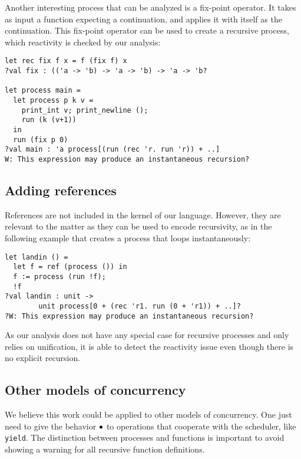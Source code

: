 \documentclass[9pt]{sigplanconf}
\begin{document}
Another interesting process that can be analyzed is a fix-point operator. It takes as input a function expecting a continuation, and applies it with itself as the continuation. This fix-point operator can be used to create a recursive process, which reactivity is checked by our analysis:
\begin{lstlisting}
let rec fix f x = f (fix f) x
?val fix : (('a -> 'b) -> 'a -> 'b) -> 'a -> 'b?

let process main =
  let process p k v =
    print_int v; print_newline (); 
    run (k (v+1))
  in
  run (fix p 0)
?val main : 'a process[(run (rec 'r. run 'r)) + ..]
W: This expression may produce an instantaneous recursion?
\end{lstlisting}

\subsection{Adding references}

References are not included in the kernel of our language. However, they are relevant to the matter as they can be used to encode recursivity, as in the following example that creates a process that loops instantaneously:
%
\begin{lstlisting}
let landin () =
  let f = ref (process ()) in
  f := process (run !f);
  !f
?val landin : unit -> 
        unit process[0 + (rec 'r1. run (0 + 'r1)) + ..]?
?W: This expression may produce an instantaneous recursion?
\end{lstlisting}
%
As our analysis does not have any special case for recursive processes and only relies on unification, it is able to detect the reactivity issue even though there is no explicit recursion.

\subsection{Other models of concurrency}
\label{sec:other_concurrency}

We believe this work could be applied to other models of concurrency. One just need to give the behavior $\bullet$ to operations that cooperate with the scheduler, like \texttt{yield}. The distinction between processes and functions is important to avoid showing a warning for all recursive function definitions.
\end{document}
